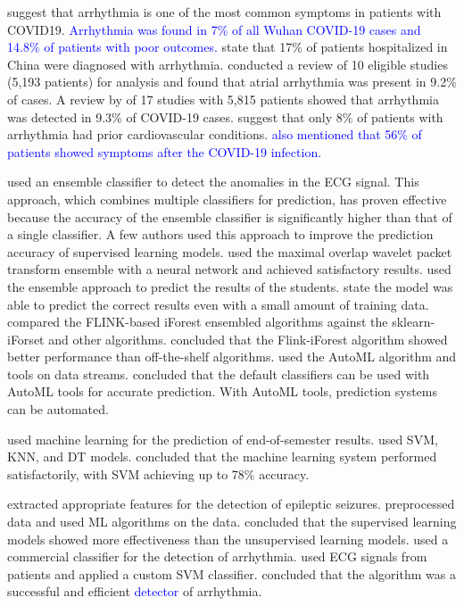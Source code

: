 \documentclass[a4paper,fleqn]{cas-dc}
\newcommand{\responsemodsm}[1]{\textcolor{blue}{#1}}
\begin{document}
\cite*{02_rp} suggest that arrhythmia is one of the most common symptoms in patients with COVID19. \responsemodsm{Arrhythmia was found in 7\% of all Wuhan COVID-19 cases and 14.8\% of patients with poor outcomes.} \cite*{18_rp} state that 17\% of patients hospitalized in China were diagnosed with arrhythmia. \citeauthor{18_rp} conducted a review of 10 eligible studies (5,193 patients) for analysis and found that atrial arrhythmia was present in 9.2\% of cases. A review by \cite*{15_rp} of 17 studies with 5,815 patients showed that arrhythmia was detected in 9.3\% of COVID-19 cases. \cite*{25_rp} suggest that only 8\% of patients with arrhythmia had prior cardiovascular conditions. \responsemodsm{\citeauthor{25_rp} also mentioned that 56\% of patients showed symptoms after the COVID-19 infection.}

\cite*{24_rp} used an ensemble classifier to detect the anomalies in the ECG signal. This approach, which combines multiple classifiers for prediction, has proven effective because the accuracy of the ensemble classifier is significantly higher than that of a single classifier. A few authors used this approach to improve the prediction accuracy of supervised learning models. \cite*{10_rp} used the maximal overlap wavelet packet transform ensemble with a neural network and achieved satisfactory results. \cite*{20_rp} used the ensemble approach to predict the results of the students. \citeauthor{20_rp} state the model was able to predict the correct results even with a small amount of training data. \cite*{16_rp} compared the FLINK-based iForest ensembled algorithms against the sklearn-iForset and other algorithms. \citeauthor{16_rp} concluded that the Flink-iForest algorithm showed better performance than off-the-shelf algorithms. \cite*{11_rp} used the AutoML algorithm and tools on data streams. \citeauthor{11_rp} concluded that the default classifiers can be used with AutoML tools for accurate prediction. With AutoML tools, prediction systems can be automated.

\cite*{ref_paper_m1} used machine learning for the prediction of end-of-semester results. \cite*{ref_paper_m1} used SVM, KNN, and DT models. \cite*{ref_paper_m1} concluded that the machine learning system performed satisfactorily, with SVM achieving up to 78\% accuracy.

\cite*{23_rp} extracted appropriate features for the detection of epileptic seizures. \citeauthor{23_rp} preprocessed data and used ML algorithms on the data. \citeauthor{23_rp} concluded that the supervised learning models showed more effectiveness than the unsupervised learning models. \cite*{12_rp} used a commercial classifier for the detection of arrhythmia. \citeauthor{12_rp} used ECG signals from patients and applied a custom SVM classifier. \citeauthor{12_rp} concluded that the algorithm was a successful and efficient \responsemodsm{detector} of arrhythmia.
\end{document}
